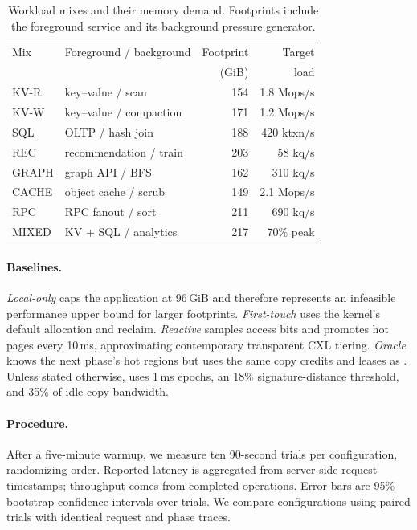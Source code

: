 \begin{table}[t]
  \caption{Workload mixes and their memory demand.  Footprints include the
    foreground service and its background pressure generator.}
  \label{tab:workloads}
  \centering
  \small
  \begin{tabular}{@{}llrr@{}}
    \toprule
    Mix & Foreground / background & Footprint & Target \\
        &                           & (GiB)     & load \\
    \midrule
    KV-R   & key--value / scan       & 154 & 1.8 Mops/s \\
    KV-W   & key--value / compaction & 171 & 1.2 Mops/s \\
    SQL    & OLTP / hash join        & 188 & 420 ktxn/s \\
    REC    & recommendation / train  & 203 & 58 kq/s \\
    GRAPH  & graph API / BFS         & 162 & 310 kq/s \\
    CACHE  & object cache / scrub    & 149 & 2.1 Mops/s \\
    RPC    & RPC fanout / sort       & 211 & 690 kq/s \\
    MIXED  & KV + SQL / analytics    & 217 & 70\% peak \\
    \bottomrule
  \end{tabular}
\end{table}

\paragraph{Baselines.}
\emph{Local-only} caps the application at 96\,GiB and therefore represents an
infeasible performance upper bound for larger footprints.  \emph{First-touch}
uses the kernel's default allocation and reclaim.  \emph{Reactive} samples
access bits and promotes hot pages every 10\,ms, approximating contemporary
transparent CXL tiering.  \emph{Oracle} knows the next phase's hot regions but
uses the same copy credits and leases as \system.  Unless stated otherwise,
\system uses 1\,ms epochs, an 18\% signature-distance threshold, and 35\% of
idle copy bandwidth.

\paragraph{Procedure.}
After a five-minute warmup, we measure ten 90-second trials per configuration,
randomizing order.  Reported latency is aggregated from server-side request
timestamps; throughput comes from completed operations.  Error bars are 95\%
bootstrap confidence intervals over trials.  We compare configurations using
paired trials with identical request and phase traces.

